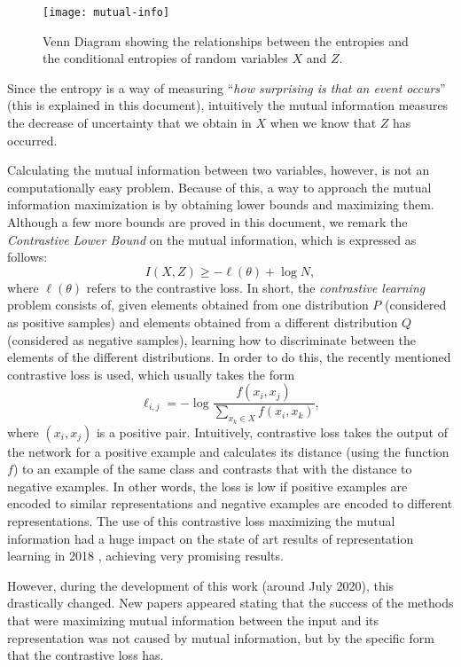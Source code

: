\begin{figure}[H]
    \centering
    \texttt{[image: mutual-info]}
    \caption{Venn Diagram showing the relationships between the entropies and the conditional entropies of random variables $X$ and $Z$.}
\end{figure}

Since the entropy is a way of measuring ``\emph{how surprising is that an event occurs}'' (this is explained in this document), intuitively the mutual information measures the decrease of uncertainty that we obtain in $X$ when we know that $Z$ has occurred.

Calculating the mutual information between two variables, however, is not an computationally easy problem. Because of this, a way to approach the mutual information maximization is by obtaining lower bounds and maximizing them. Although a few more bounds are proved in this document, we remark the \emph{Contrastive Lower Bound} on the mutual information, which is expressed as follows:
\[
I(X,Z)  \geq - \ell(\theta) + \log N,
\]
where $\ell(\theta)$ refers to the contrastive loss. In short, the \emph{contrastive learning} problem consists of, given elements obtained from one distribution $P$ (considered as positive samples) and elements obtained from a different distribution $Q$ (considered as negative samples), learning how to discriminate between the elements of the different distributions. In order to do this, the recently mentioned contrastive loss is used, which usually takes the form
\[
\ell_{i,j} = -  \log \frac{f(x_i,x_j)}{\sum_{x_k \in X}f(x_i,x_k)},
\] 
where $(x_i,x_j)$ is a positive pair. Intuitively, contrastive loss takes the output of the network for a positive example and calculates its distance (using the function $f$) to an example of the same class and contrasts that with the distance to negative examples. In other words, the loss is low if positive examples are encoded to similar representations and negative examples are encoded to different representations. The use of this contrastive loss maximizing the mutual information had a huge impact on the state of art results of representation learning in 2018 \citep{oord_representation_2019}, achieving very promising results.

However, during the development of this work (around July 2020), this drastically changed. New papers  \citep{chen_simple_2020, grill2020bootstrap} appeared stating that the success of the methods that were maximizing mutual information between the input and its representation was not caused by mutual information, but by the specific form that the contrastive loss has.

